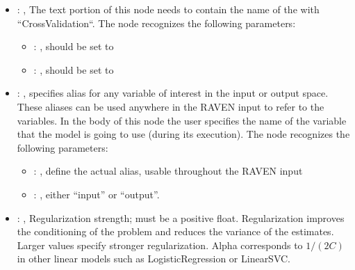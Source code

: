 \begin{itemize}
\begin{itemize}
        \item {}: ,
          List of IDs of features/variables to include in the transformation process.

        \item {}: ,
          Which space to search? Target or Feature?
      \end{itemize}

    \item {}: ,
      The text portion of this node needs to contain the name of the  with
               ``CrossValidation``.
      The  node recognizes the following parameters:
        \begin{itemize}
          \item {}: ,
            should be set to 
          \item {}: ,
            should be set to 
      \end{itemize}

    \item {}: ,
      specifies alias for         any variable of interest in the input or output space. These
      aliases can be used anywhere in the RAVEN input to         refer to the variables. In the body
      of this node the user specifies the name of the variable that the model is going to use
      (during its execution).
      The  node recognizes the following parameters:
        \begin{itemize}
          \item {}: ,
            define the actual alias, usable throughout the RAVEN input
          \item {}: ,
            either ``input'' or ``output''.
      \end{itemize}

    \item {}: ,
      Regularization strength; must be a positive float. Regularization
      improves the conditioning of the problem and reduces the variance of the estimates.
      Larger values specify stronger regularization. Alpha corresponds to $1 / (2C)$ in other
      linear models such as LogisticRegression or LinearSVC.


\end{itemize}
